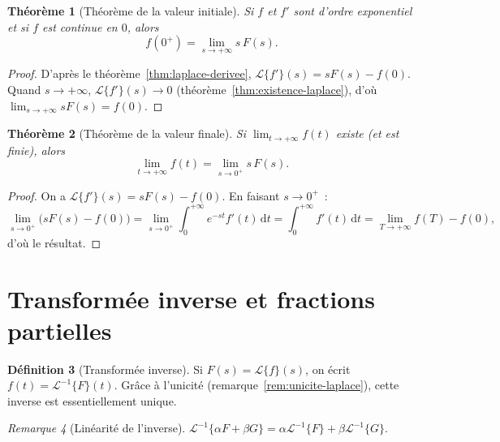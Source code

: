 \documentclass[12pt,a4paper,openany]{book}
\theoremstyle{definition}
\newtheorem{definition}{Définition}[chapter]
\theoremstyle{plain}
\newtheorem{theoreme}[definition]{Théorème}
\theoremstyle{remark}
\newtheorem{remarque}[definition]{Remarque}
\newcommand{\dd}{\mathrm{d}}
\begin{document}
\begin{theoreme}[Théorème de la valeur initiale]\label{thm:val-initiale}
  Si $f$ et $f'$ sont d'ordre exponentiel et si $f$ est continue en $0$, alors
  \[
    f(0^+) = \lim_{s\to+\infty} s\,F(s).
  \]
\end{theoreme}

\begin{proof}
  D'après le théorème~\ref{thm:laplace-derivee},
  $\mathcal{L}\{f'\}(s)=sF(s)-f(0)$. Quand $s\to+\infty$,
  $\mathcal{L}\{f'\}(s)\to 0$ (théorème~\ref{thm:existence-laplace}),
  d'où $\lim_{s\to+\infty}sF(s)=f(0)$.
\end{proof}

\begin{theoreme}[Théorème de la valeur finale]\label{thm:val-finale}
  Si $\lim_{t\to+\infty}f(t)$ existe (et est finie), alors
  \[
    \lim_{t\to+\infty}f(t) = \lim_{s\to 0^+} s\,F(s).
  \]
\end{theoreme}

\begin{proof}
  On a $\mathcal{L}\{f'\}(s)=sF(s)-f(0)$. En faisant $s\to 0^+$~:
  \[
    \lim_{s\to 0^+}\bigl(sF(s)-f(0)\bigr)
    = \lim_{s\to 0^+}\int_0^{+\infty}e^{-st}f'(t)\,\dd t
    = \int_0^{+\infty}f'(t)\,\dd t
    = \lim_{T\to+\infty}f(T)-f(0),
  \]
  d'où le résultat.
\end{proof}

\section{Transformée inverse et fractions partielles}\label{sec:laplace-inverse}

\begin{definition}[Transformée inverse]\label{def:laplace-inv}
  Si $F(s)=\mathcal{L}\{f\}(s)$, on écrit
  $f(t)=\mathcal{L}^{-1}\{F\}(t)$. Grâce à l'unicité
  (remarque~\ref{rem:unicite-laplace}), cette inverse est
  essentiellement unique.
\end{definition}

\begin{remarque}[Linéarité de l'inverse]\label{rem:inv-lin}
  $\mathcal{L}^{-1}\{\alpha F+\beta G\}=\alpha\mathcal{L}^{-1}\{F\}
  +\beta\mathcal{L}^{-1}\{G\}$.
\end{remarque}
\end{document}
